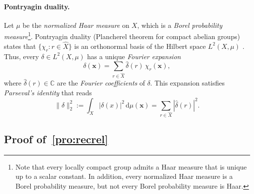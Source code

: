 \documentclass[12pt,reqno]{article}
\begin{document}
\paragraph{Pontryagin duality.}
Let $\mu$ be the \emph{normalized Haar measure} on $X$,  which is a \emph{Borel probability measure}\footnote{Note that every locally compact group admits a Haar measure that is unique up to a scalar constant.  In addition,  every normalized Haar measure is a Borel probability measure,  but not every Borel probability measure is Haar.}.
Pontryagin duality (Plancherel theorem for compact abelian groups)~\cite{Tao-Note}
 states that $\{\chi_r : r\in\widehat X\}$ is an orthonormal basis of the Hilbert space 
$L^2(X,\mu)$ \cite[Cor.~4.27]{AHA}. Thus, every $\delta \in L^2(X,\mu)$ has a unique \emph{Fourier expansion}
\begin{equation}
    \label{eq:fourier_decomposition}
    \delta(\mathbf{x}) =
    \sum_{r\in\widehat X} \hat\delta(r)\,\chi_r(\mathbf{x}),
\end{equation}
where $\hat\delta(r) \in \mathbb{C}$ are the {\em Fourier coefficients} of $\delta$.
This expansion satisfies {\em Parseval's identity} \cite[Prop.~4.25, Thm.~4.26]{AHA} that reads
\begin{equation}
    \label{eq:parseval}
    \|\delta\|_2^2 := 
    \int_X |\delta(x)|^2 \, \mathrm{d}\mu(\mathbf{x}) = 
    \sum_{r \in \widehat X}
    |\hat\delta(r)|^2.
\end{equation}

\subsection{Proof of~\cref{pro:recrel}}
\label{sec: proof of Prop 20 for unicity}
\end{document}
